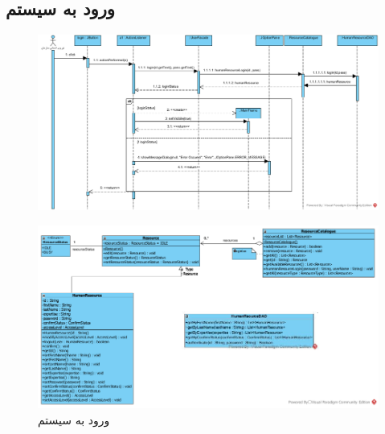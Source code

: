 \begin{landscape}
\section{ورود به سیستم}
\begin{figure}[H]
	\centering
	\includegraphics[scale=0.65]{img/sequence-design/SignIn}
\end{figure}
\begin{figure}[H]
	\centering
	\includegraphics[scale=0.6]{img/sequence-design/SignInCD}
	\caption{ورود به سیستم}
\end{figure}
\end{landscape}